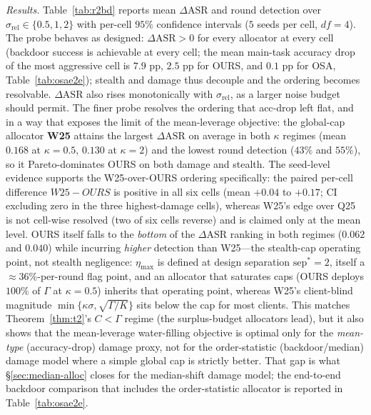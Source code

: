 \documentclass[final,1p,times]{elsarticle}
\begin{document}
\emph{Results.} Table~\ref{tab:r2bd} reports mean $\Delta\mathrm{ASR}$ and
round detection over $\sigma_{\mathrm{rel}}{\in}\{0.5,1,2\}$ with per-cell
$95\%$ confidence intervals ($5$ seeds per cell, $df{=}4$). The probe behaves
as designed: $\Delta\mathrm{ASR}{>}0$ for every allocator at every
cell (backdoor success is achievable at every cell; the mean main-task
accuracy drop of the most aggressive cell is $7.9$ pp, $2.5$ pp for
OURS, and $0.1$ pp for OSA, Table~\ref{tab:osae2e}); stealth and damage thus decouple and the
ordering becomes resolvable. $\Delta\mathrm{ASR}$ also
rises monotonically with $\sigma_{\mathrm{rel}}$, as a larger noise budget should
permit. The finer probe resolves the ordering that acc-drop left flat, and
in a way that exposes the limit of the mean-leverage objective: the global-cap
allocator \textbf{W25} attains the largest $\Delta\mathrm{ASR}$ on average in both
$\kappa$ regimes (mean $0.168$ at $\kappa{=}0.5$, $0.130$ at $\kappa{=}2$) and
the lowest round detection ($43\%$ and $55\%$), so it Pareto-dominates
OURS on both damage and stealth. The seed-level evidence supports the
W25-over-OURS ordering specifically: the paired per-cell difference
$W25{-}OURS$ is positive in all six cells (mean $+0.04$ to $+0.17$;
CI excluding zero in the three highest-damage cells), whereas W25's
edge over Q25 is not cell-wise resolved (two of six cells reverse) and
is claimed only at the mean level. OURS itself falls to the \emph{bottom} of the
$\Delta\mathrm{ASR}$ ranking in both regimes ($0.062$ and $0.040$) while
incurring \emph{higher} detection than W25---the stealth-cap operating
point, not stealth negligence: $\eta_{\max}$ is defined at design
separation $\mathrm{sep}^{*}=2$, itself a $\approx36\%$-per-round flag
point, and an allocator that saturates caps (OURS deploys $100\%$ of
$\Gamma$ at $\kappa{=}0.5$) inherits that operating point, whereas
W25's client-blind magnitude $\min\{\kappa\sigma,\sqrt{\Gamma/K}\}$
sits below the cap for most clients. This matches
Theorem~\ref{thm:t2}'s $C{<}\Gamma$ regime (the surplus-budget allocators lead),
but it also shows that the mean-leverage water-filling objective is optimal only
for the \emph{mean-type} (accuracy-drop) damage proxy, not for the
order-statistic (backdoor/median) damage model where a simple global cap is
strictly better. That gap is what \S\ref{sec:median-alloc} closes for
the median-shift damage model; the end-to-end backdoor comparison that
includes the order-statistic allocator is reported in
Table~\ref{tab:osae2e}.
\end{document}
